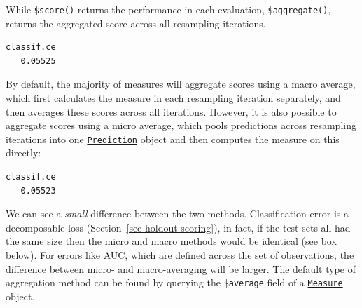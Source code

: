 While \texttt{\$score()} returns the performance in each evaluation,
\texttt{\$aggregate()},
returns the aggregated score across all resampling iterations.

\begin{Shaded}
\begin{Highlighting}[]
\SpecialCharTok{$}\NormalTok{(}\NormalTok{(}\NormalTok{))}
\end{Highlighting}
\end{Shaded}

\begin{verbatim}
classif.ce 
   0.05525 
\end{verbatim}

By default, the majority of measures will aggregate scores using a macro
average, which first calculates the measure in each
resampling iteration separately, and then averages these scores across
all iterations. However, it is also possible to aggregate scores using a
micro average, which pools predictions across
resampling iterations into one
\href{https://mlr3.mlr-org.com/reference/Prediction.html}{\texttt{Prediction}}
object and then computes the measure on this directly:

\begin{Shaded}
\begin{Highlighting}[]
\SpecialCharTok{$}\NormalTok{(}\NormalTok{(}\NormalTok{, } \NormalTok{))}
\end{Highlighting}
\end{Shaded}

\begin{verbatim}
classif.ce 
   0.05523 
\end{verbatim}

We can see a \emph{small} difference between the two methods.
Classification error is a decomposable loss
(Section~\ref{sec-holdout-scoring}), in fact, if the test sets all had
the same size then the micro and macro methods would be identical (see
box below). For errors like AUC, which are defined across the set of
observations, the difference between micro- and macro-averaging will be
larger. The default type of aggregation method can be found by querying
the \texttt{\$average} field of a
\href{https://mlr3.mlr-org.com/reference/Measure.html}{\texttt{Measure}}
object.

